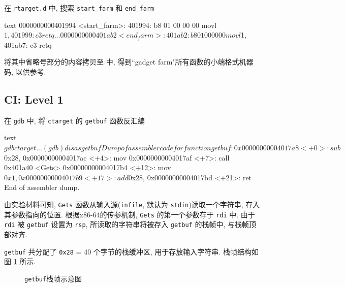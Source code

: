 在 \verb|rtarget.d| 中, 搜索 \verb|start_farm| 和 \verb|end_farm|
\begin{code}{text}
0000000000401994 <start_farm>:
  401994: b8 01 00 00 00                movl    $1, %
  401999: c3                            retq

...

0000000000401ab2 <end_farm>:
  401ab2: b8 01 00 00 00                movl    $1, %
  401ab7: c3                            retq
\end{code}
将其中省略号部分的内容拷贝至  中, 得到“gadget farm"所有函数的小端格式机器码, 以供参考.

\subsection{CI: Level 1}

在 \verb|gdb| 中, 将 \verb|ctarget| 的 \verb|getbuf| 函数反汇编
\begin{code}{text}
$ gdb ctarget
...
(gdb) disas getbuf
Dump of assembler code for function getbuf:
   0x00000000004017a8 <+0>:     sub    $0x28,%
   0x00000000004017ac <+4>:     mov    %
   0x00000000004017af <+7>:     call   0x401a40 <Gets>
   0x00000000004017b4 <+12>:    mov    $0x1,%
   0x00000000004017b9 <+17>:    add    $0x28,%
   0x00000000004017bd <+21>:    ret
End of assembler dump.
\end{code}

由实验材料可知, \verb|Gets| 函数从输入源(\verb|infile|, 默认为 \verb|stdin|)读取一个字符串, 存入其参数指向的位置. 根据x86-64的传参机制, \verb|Gets| 的第一个参数存于 \verb|rdi| 中. 由于 \verb|rdi| 被 \verb|getbuf| 设置为 \verb|rsp|, 所读取的字符串将被存入 \verb|getbuf| 的栈帧中, 与栈帧顶部对齐.

\verb|getbuf| 共分配了 \verb|0x28| = 40 个字节的栈缓冲区, 用于存放输入字符串. 栈帧结构如图 \ref{stackframe} 所示.

\begin{figure}[H]
    \centering
    \caption{\texttt{getbuf}栈帧示意图}\label{stackframe}
\end{figure}

